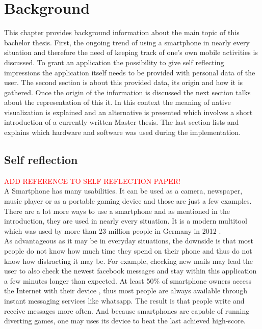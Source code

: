 \chapter{Background}
\label{cha:background}
This chapter provides background information about the main topic of this bachelor thesis. First, the ongoing trend of using a smartphone in nearly every situation and therefore the need of keeping track of one's own mobile activities is discussed. To grant an application the possibility to give self reflecting impressions the application itself needs to be provided with personal data of the user. The second section is about this provided data, its origin and how it is gathered. Once the origin of the information is discussed the next section talks about the representation of this it. In this context the meaning of native visualization is explained and an alternative is presented which involves a short introduction of a currently written Master thesis. The last section lists and explains which hardware and software was used during the implementation.

\section{Self reflection}
\textcolor{red}{ADD REFERENCE TO SELF REFLECTION PAPER!}\\
A Smartphone has many usabilities. It can be used as a camera, newspaper, music player or as a portable gaming device and those are just a few examples. There are a lot more ways to use a smartphone and as mentioned in the introduction, they are used in nearly every situation. It is a modern multitool which was used by more than 23 million people in Germany in 2012 \cite{gstatistic}.\\
As  advantageous as it may be in everyday situations, the downside is that most people do not know how much time they spend on their phone and thus do not know how distracting it may be.
For example, checking new mails may lead the user to also check the newest facebook messages and stay within this application a few minutes longer than expected. At least 50\% of smartphone owners access the Internet with their device \cite{gstatistic}, thus most people are always available through instant messaging services like whatsapp. The result is that people write and receive messages more often. And because smartphones are capable of running diverting games, one may uses its device to beat the last achieved high-score.

